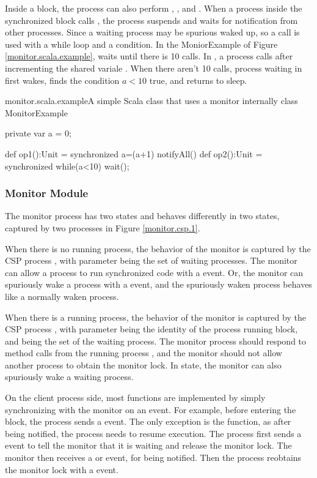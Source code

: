 \documentclass[a4paper, 12pt]{article}
\begin{document}
Inside a  block, the process can also perform , , and . When a process inside the synchronized block calls , the process suspends and waits for notification from other processes. Since a waiting process may be spurious waked up, so a  call is used with a while loop and a condition. In the MoniorExample of Figure \ref{monitor.scala.example},  waits until there is 10  calls. In , a process calls  after incrementing the shared variale . When there aren't 10  calls, process waiting in  first wakes, finds the condition $a<10$ true, and returns to sleep. 


\begin{scalafloat}{monitor.scala.example}{A simple Scala class that uses a monitor internally}
class MonitorExample {
  private var a = 0;

  def op1():Unit = synchronized{ 
    a=(a+1)%
    notifyAll()
  }
  def op2():Unit = synchronized{ 
    while(a<10) wait();
  }
}
\end{scalafloat}
  
\subsubsection{Monitor Module}
The monitor process has two states and behaves differently in two states, captured by two processes in Figure \ref{monitor.csp.1}.

When there is no running process, the behavior of the monitor is captured by the CSP process , with parameter  being the set of waiting processes. The monitor can allow a process to run synchronized code with a  event. Or, the monitor can spuriously wake a process with a  event, and the spuriously waken process behaves like a normally waken process.

When there is a running process, the behavior of the monitor is captured by the CSP process , with parameter  being the identity of the process running  block, and  being the set of the waiting process. The monitor process should respond to method calls from the running process , and the monitor should not allow another process to obtain the monitor lock. In  state, the monitor can also spuriously wake a waiting process. 

On the client process side, most functions are implemented by simply synchronizing with the monitor on an event. For example, before entering the  block, the process sends a  event. The only exception is the  function, as after being notified, the process needs to resume execution. The process first sends a  event to tell the monitor that it is waiting and release the monitor lock. The monitor then receives a  or  event, for being notified. Then the process reobtains the monitor lock with a  event. 
\end{document}
